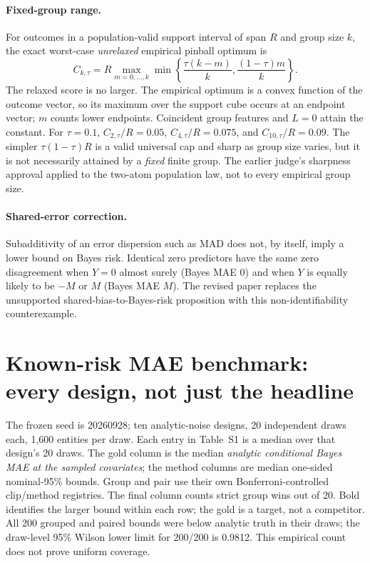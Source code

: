 \documentclass[10pt]{article}
\begin{document}
\paragraph{Fixed-group range.} For outcomes in a population-valid support interval of span $R$ and group size $k$, the exact worst-case \emph{unrelaxed} empirical pinball optimum is
\[
C_{k,\tau}=R\max_{m=0,\ldots,k}\min\left\{\frac{\tau(k-m)}{k},\frac{(1-\tau)m}{k}\right\}.
\]
The relaxed score is no larger. The empirical optimum is a convex function of the outcome vector, so its maximum over the support cube occurs at an endpoint vector; $m$ counts lower endpoints. Coincident group features and $L=0$ attain the constant. For $\tau=0.1$, $C_{2,\tau}/R=0.05$, $C_{4,\tau}/R=0.075$, and $C_{10,\tau}/R=0.09$. The simpler $\tau(1-\tau)R$ is a valid universal cap and sharp as group size varies, but it is not necessarily attained by a \emph{fixed} finite group. The earlier judge's sharpness approval applied to the two-atom population law, not to every empirical group size.

\paragraph{Shared-error correction.} Subadditivity of an error dispersion such as MAD does not, by itself, imply a lower bound on Bayes risk. Identical zero predictors have the same zero disagreement when $Y=0$ almost surely (Bayes MAE $0$) and when $Y$ is equally likely to be $-M$ or $M$ (Bayes MAE $M$). The revised paper replaces the unsupported shared-bias-to-Bayes-risk proposition with this non-identifiability counterexample.

\section{Known-risk MAE benchmark: every design, not just the headline}
The frozen seed is 20260928; ten analytic-noise designs, 20 independent draws each, 1,600 entities per draw. Each entry in Table~S1 is a median over that design's 20 draws. The gold column is the median \emph{analytic conditional Bayes MAE at the sampled covariates}; the method columns are median one-sided nominal-95\% bounds. Group and pair use their own Bonferroni-controlled clip/method registries. The final column counts strict group wins out of 20. Bold identifies the larger bound within each row; the gold is a target, not a competitor. All 200 grouped and paired bounds were below analytic truth in their draws; the draw-level 95\% Wilson lower limit for 200/200 is 0.9812. This empirical count does not prove uniform coverage.
\end{document}
